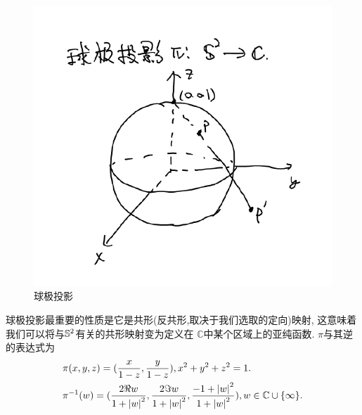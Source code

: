 \begin{figure}[ht]
	\centering
	\includegraphics[scale=0.5]{images/stereo.png}
	\caption{球极投影}
	\label{stereopng}
\end{figure}
球极投影最重要的性质是它是共形(反共形,取决于我们选取的定向)映射, 这意味着我们可以将与$\S^2$有关的共形映射变为定义在 $\mathbb{C}$中某个区域上的亚纯函数. $\pi$与其逆的表达式为
\begin{align}
    &\pi(x,y,z)=(\frac{x}{1-z}, \frac{y}{1-z}), x^2+y^2+z^2=1. \\
    &\pi^{-1}(w)= (\frac{2\Re w}{1+\abs{w}^2}, \frac{2\Im w}{1+\abs{w}^2}, \frac{-1+\abs{w}^2}{1+\abs{w}^2}), w \in \mathbb{C} \cup \{\infty\}.
\end{align}
